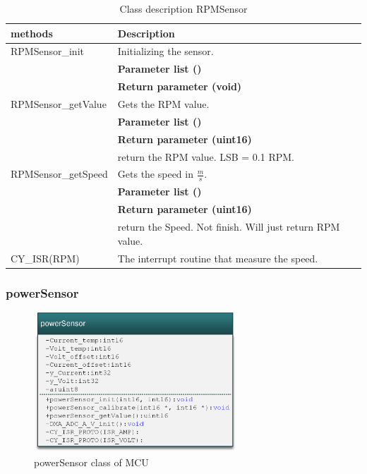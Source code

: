 \begin{table}[H]
	\centering
	\begin{tabular}{|p{5 cm}|p{10 cm}|}
		\hline
		\textbf{methods} & \textbf{Description} \\ \hline
		
		RPMSensor\_init
		& Initializing the sensor. 
		\\ & \textbf{Parameter list ()}
		\\ & \textbf{Return parameter (void)}
		\\ \hline
		
		RPMSensor\_getValue
		& Gets the RPM value.
		\\ & \textbf{Parameter list ()}
		\\ & \textbf{Return parameter (uint16)}
		\\ & return the RPM value. LSB = 0.1 RPM.
		\\ \hline

		RPMSensor\_getSpeed
		& Gets the speed in $ \frac{m}{s} $.
		\\ & \textbf{Parameter list ()}
		\\ & \textbf{Return parameter (uint16)}
		\\ & return the Speed. Not finish. Will just return RPM value.
		\\ \hline
		
		CY\_ISR(RPM)
		& The interrupt routine that measure the speed.
		\\ \hline
		
	\end{tabular}
	\caption{Class description RPMSensor}
	\label{table:Class_description_RPMSensor_MCU}
\end{table}

\subsubsection{powerSensor}

\begin{figure}[H]
	\centering
	\includegraphics [width=3in]{Software/Pictures/class-diagram-powerSensor.png}
	\caption{powerSensor class of MCU}
	\label{fig:Class_diagram_MCU_powerSensor}
\end{figure}

